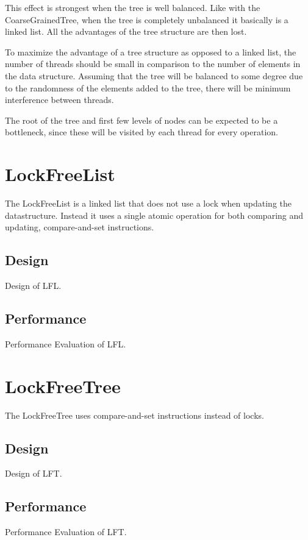 \documentclass[a4paper]{article}
\begin{document}
This effect is strongest when the tree is well balanced. Like with the
CoarseGrainedTree, when the tree is completely unbalanced it basically is
a linked list. All the advantages of the tree structure are then lost.

To maximize the advantage of a tree structure as opposed to a linked list, the
number of threads should be small in comparison to the number of elements in the
data structure. Assuming that the tree will be balanced to some degree due to the
randomness of the elements added to the tree, there will be minimum interference
between threads.

The root of the tree and first few levels of nodes can be expected to be a
bottleneck, since these will be visited by each thread for every operation.

\section{LockFreeList}

The LockFreeList is a linked list that does not use a lock when updating
the datastructure. Instead it uses a single atomic operation for both
comparing and updating, compare-and-set instructions.

\subsection{Design}

Design of LFL.

\subsection{Performance}

Performance Evaluation of LFL.

\section{LockFreeTree}

The LockFreeTree uses compare-and-set instructions instead of locks.

\subsection{Design}

Design of LFT.

\subsection{Performance}

Performance Evaluation of LFT.
\end{document}
